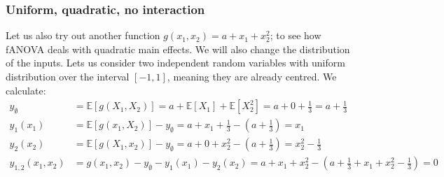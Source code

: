 \subsubsection*{Uniform, quadratic, no interaction}
Let us also try out another function $g(x_1, x_2) = a + x_1 + x_2^2$; to see how fANOVA deals with quadratic main effects. 
We will also change the distribution of the inputs. Lets us consider two independent random variables with uniform distribution over the interval \([-1, 1]\), meaning they are already centred. We calculate:
\begin{align*}
y_\emptyset &= \mathbb{E}[g(X_1, X_2)] = a + \mathbb{E}[X_1] + \mathbb{E}[X_2^2] = a + 0 + \tfrac{1}{3} = a + \tfrac{1}{3} \\
y_1(x_1) &= \mathbb{E}[g(x_1, X_2)] - y_\emptyset = a + x_1 + \tfrac{1}{3} - \left(a + \tfrac{1}{3}\right) = x_1 \\
y_2(x_2) &= \mathbb{E}[g(X_1, x_2)] - y_\emptyset = a + 0 + x_2^2 - \left(a + \tfrac{1}{3}\right) = x_2^2 - \tfrac{1}{3} \\
y_{1,2}(x_1, x_2) &= g(x_1, x_2) - y_\emptyset - y_1(x_1) - y_2(x_2) = a + x_1 + x_2^2 - \left(a + \tfrac{1}{3} + x_1 + x_2^2 - \tfrac{1}{3}\right) = 0
\end{align*}

